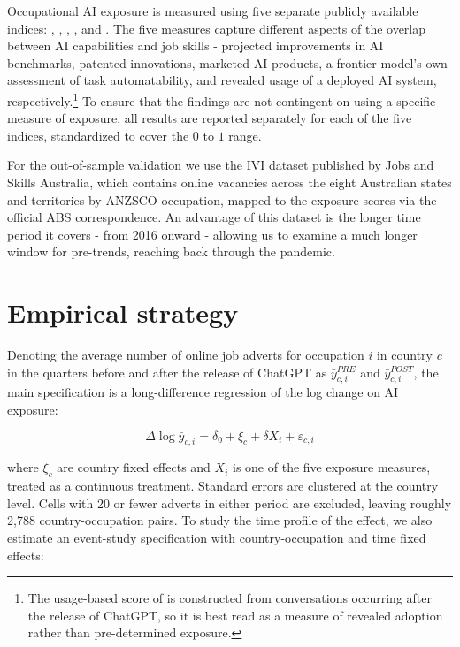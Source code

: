 \documentclass[11pt]{article}
\begin{document}
Occupational AI exposure is measured using five separate publicly available indices: \citet{felten_method_2018}, \citet{webb_impact_2022}, \citet{eloundou_gpts_2023}, \citet{demirev2024assessing}, and \citet{handa2025economic}. The five measures capture different aspects of the overlap between AI capabilities and job skills - projected improvements in AI benchmarks, patented innovations, marketed AI products, a frontier model's own assessment of task automatability, and revealed usage of a deployed AI system, respectively.\footnote{The usage-based score of \citet{handa2025economic} is constructed from conversations occurring after the release of ChatGPT, so it is best read as a measure of revealed adoption rather than pre-determined exposure.} To ensure that the findings are not contingent on using a specific measure of exposure, all results are reported separately for each of the five indices, standardized to cover the $0$ to $1$ range.

For the out-of-sample validation we use the IVI dataset published by Jobs and Skills Australia, which contains online vacancies across the eight Australian states and territories by ANZSCO occupation, mapped to the exposure scores via the official ABS correspondence. An advantage of this dataset is the longer time period it covers - from 2016 onward - allowing us to examine a much longer window for pre-trends, reaching back through the pandemic.

\section{Empirical strategy}

Denoting the average number of online job adverts for occupation $i$ in country $c$ in the quarters before and after the release of ChatGPT as $\bar{y}^{PRE}_{c,i}$ and $\bar{y}^{POST}_{c,i}$, the main specification is a long-difference regression of the log change on AI exposure:

\begin{equation}
    \Delta\log{\bar{y}}_{c,i} = \delta_0 + \xi_c + \delta X_i + \varepsilon_{c,i}
\label{eq:delta}
\end{equation}

where $\xi_c$ are country fixed effects and $X_i$ is one of the five exposure measures, treated as a continuous treatment. Standard errors are clustered at the country level. Cells with 20 or fewer adverts in either period are excluded, leaving roughly 2,788 country-occupation pairs. To study the time profile of the effect, we also estimate an event-study specification with country-occupation and time fixed effects:
\end{document}
